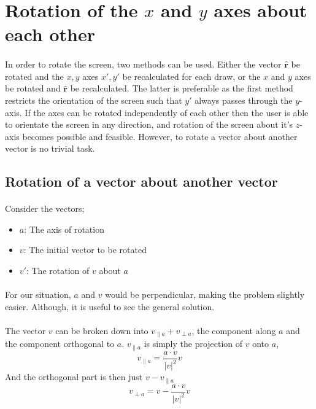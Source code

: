 \documentclass{article}
\newcommand\ru{\hat{\mathbf{r}}\xspace}
\newcommand\proj[2]{\frac{#1 \cdot #2}{\left|#2\right|^2} #2}
\newcommand\xp{x\prime\xspace}
\newcommand\yp{y\prime\xspace}
\newcommand\vp{v\prime\xspace}
\begin{document}
\section{Rotation of the $x$ and $y$ axes about each other}
	\paragraph{}
	In order to rotate the screen, two methods can be used. Either the vector $\ru$ be rotated and the $x, y$ axes $\xp, \yp$ be recalculated for each draw,
	or the $x$ and $y$ axes be rotated and $\ru$ be recalculated. The latter is preferable as the first method restricts the orientation of the screen such that $\yp$ always passes through the $y$-axis.
	If the axes can be rotated independently of each other then the user is able to orientate the screen in any direction,
	and rotation of the screen about it's $z$-axis becomes possible and feasible. However, to rotate a vector about another vector is no trivial task.
	\subsection{Rotation of a vector about another vector}
	\paragraph{}
	Consider the vectors;
	\begin{itemize}
	\item $a$: The axis of rotation
	\item $v$: The initial vector to be rotated
	\item $\vp$: The rotation of $v$ about $a$
	\end{itemize}
	\paragraph{}
	For our situation, $a$ and $v$ would be perpendicular, making the problem slightly easier. Although, it is useful to see the general solution.
	\paragraph{}
	The vector $v$ can be broken down into $v_{\parallel a} + v_{\perp a}$, the component along $a$ and the component orthogonal to $a$.
	$v_{\parallel a}$ is simply the projection of $v$ onto $a$,
	$$v_{\parallel a} = \proj{a}{v}$$
	And the orthogonal part is then just $v - v_{\parallel a}$
	$$v_{\perp a} = v - \proj{a}{v}$$
\end{document}
